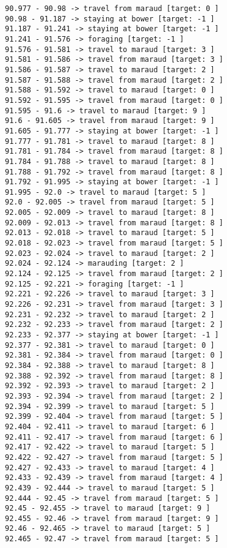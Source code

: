 \documentclass[11pt]{article}
\begin{document}
\begin{Verbatim}[commandchars=\\\{\}]
90.977 - 90.98 -> travel from maraud [target: 0 ]
90.98 - 91.187 -> staying at bower [target: -1 ]
91.187 - 91.241 -> staying at bower [target: -1 ]
91.241 - 91.576 -> foraging [target: -1 ]
91.576 - 91.581 -> travel to maraud [target: 3 ]
91.581 - 91.586 -> travel from maraud [target: 3 ]
91.586 - 91.587 -> travel to maraud [target: 2 ]
91.587 - 91.588 -> travel from maraud [target: 2 ]
91.588 - 91.592 -> travel to maraud [target: 0 ]
91.592 - 91.595 -> travel from maraud [target: 0 ]
91.595 - 91.6 -> travel to maraud [target: 9 ]
91.6 - 91.605 -> travel from maraud [target: 9 ]
91.605 - 91.777 -> staying at bower [target: -1 ]
91.777 - 91.781 -> travel to maraud [target: 8 ]
91.781 - 91.784 -> travel from maraud [target: 8 ]
91.784 - 91.788 -> travel to maraud [target: 8 ]
91.788 - 91.792 -> travel from maraud [target: 8 ]
91.792 - 91.995 -> staying at bower [target: -1 ]
91.995 - 92.0 -> travel to maraud [target: 5 ]
92.0 - 92.005 -> travel from maraud [target: 5 ]
92.005 - 92.009 -> travel to maraud [target: 8 ]
92.009 - 92.013 -> travel from maraud [target: 8 ]
92.013 - 92.018 -> travel to maraud [target: 5 ]
92.018 - 92.023 -> travel from maraud [target: 5 ]
92.023 - 92.024 -> travel to maraud [target: 2 ]
92.024 - 92.124 -> marauding [target: 2 ]
92.124 - 92.125 -> travel from maraud [target: 2 ]
92.125 - 92.221 -> foraging [target: -1 ]
92.221 - 92.226 -> travel to maraud [target: 3 ]
92.226 - 92.231 -> travel from maraud [target: 3 ]
92.231 - 92.232 -> travel to maraud [target: 2 ]
92.232 - 92.233 -> travel from maraud [target: 2 ]
92.233 - 92.377 -> staying at bower [target: -1 ]
92.377 - 92.381 -> travel to maraud [target: 0 ]
92.381 - 92.384 -> travel from maraud [target: 0 ]
92.384 - 92.388 -> travel to maraud [target: 8 ]
92.388 - 92.392 -> travel from maraud [target: 8 ]
92.392 - 92.393 -> travel to maraud [target: 2 ]
92.393 - 92.394 -> travel from maraud [target: 2 ]
92.394 - 92.399 -> travel to maraud [target: 5 ]
92.399 - 92.404 -> travel from maraud [target: 5 ]
92.404 - 92.411 -> travel to maraud [target: 6 ]
92.411 - 92.417 -> travel from maraud [target: 6 ]
92.417 - 92.422 -> travel to maraud [target: 5 ]
92.422 - 92.427 -> travel from maraud [target: 5 ]
92.427 - 92.433 -> travel to maraud [target: 4 ]
92.433 - 92.439 -> travel from maraud [target: 4 ]
92.439 - 92.444 -> travel to maraud [target: 5 ]
92.444 - 92.45 -> travel from maraud [target: 5 ]
92.45 - 92.455 -> travel to maraud [target: 9 ]
92.455 - 92.46 -> travel from maraud [target: 9 ]
92.46 - 92.465 -> travel to maraud [target: 5 ]
92.465 - 92.47 -> travel from maraud [target: 5 ]

\end{Verbatim}
\end{document}
